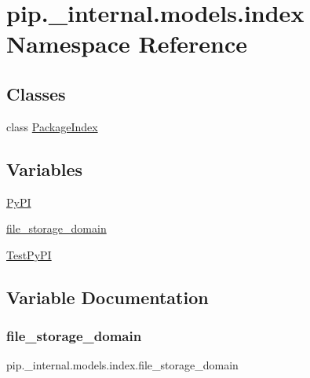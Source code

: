 \hypertarget{namespacepip_1_1__internal_1_1models_1_1index}{}\section{pip.\+\_\+internal.\+models.\+index Namespace Reference}
\label{namespacepip_1_1__internal_1_1models_1_1index}
\subsection*{Classes}
\begin{DoxyCompactItemize}
\item 
class \hyperlink{classpip_1_1__internal_1_1models_1_1index_1_1PackageIndex}{Package\+Index}
\end{DoxyCompactItemize}
\subsection*{Variables}
\begin{DoxyCompactItemize}
\item 
\hyperlink{namespacepip_1_1__internal_1_1models_1_1index_a952a3ac16189a16210f15baa4a4d824e}{Py\+PI}
\item 
\hyperlink{namespacepip_1_1__internal_1_1models_1_1index_ae6dcf64d5781fa509939d72c52c9ff2e}{file\+\_\+storage\+\_\+domain}
\item 
\hyperlink{namespacepip_1_1__internal_1_1models_1_1index_a0e0fbefeb05659fe422ed18cb03b6b6e}{Test\+Py\+PI}
\end{DoxyCompactItemize}


\subsection{Variable Documentation}
\mbox{\label{namespacepip_1_1__internal_1_1models_1_1index_ae6dcf64d5781fa509939d72c52c9ff2e}} 
\subsubsection{\texorpdfstring{file\+\_\+storage\+\_\+domain}{file\_storage\_domain}}
{\footnotesize\ttfamily pip.\+\_\+internal.\+models.\+index.\+file\+\_\+storage\+\_\+domain}

